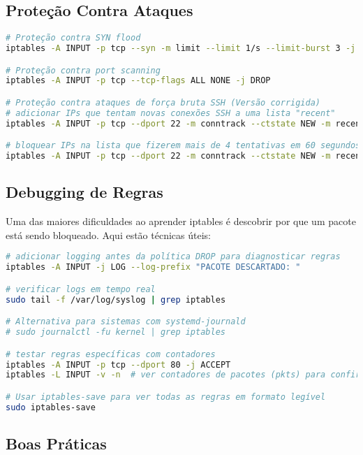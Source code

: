 ﻿\documentclass[12pt,fleqn]{article}
\begin{document}
\subsection{Proteção Contra Ataques}

\begin{lstlisting}[language=bash, caption=Proteções de segurança]
# Proteção contra SYN flood
iptables -A INPUT -p tcp --syn -m limit --limit 1/s --limit-burst 3 -j ACCEPT

# Proteção contra port scanning
iptables -A INPUT -p tcp --tcp-flags ALL NONE -j DROP

# Proteção contra ataques de força bruta SSH (Versão corrigida)
# adicionar IPs que tentam novas conexões SSH a uma lista "recent"
iptables -A INPUT -p tcp --dport 22 -m conntrack --ctstate NEW -m recent --set --name SSH --rsource

# bloquear IPs na lista que fizerem mais de 4 tentativas em 60 segundos
iptables -A INPUT -p tcp --dport 22 -m conntrack --ctstate NEW -m recent --update --seconds 60 --hitcount 4 --name SSH --rsource -j DROP
\end{lstlisting}

\subsection{Debugging de Regras}

Uma das maiores dificuldades ao aprender iptables é descobrir por que um pacote está sendo bloqueado. Aqui estão técnicas úteis:

\begin{lstlisting}[language=bash, caption=Técnicas de debugging]
# adicionar logging antes da política DROP para diagnosticar regras
iptables -A INPUT -j LOG --log-prefix "PACOTE DESCARTADO: "

# verificar logs em tempo real
sudo tail -f /var/log/syslog | grep iptables

# Alternativa para sistemas com systemd-journald
# sudo journalctl -fu kernel | grep iptables

# testar regras específicas com contadores
iptables -A INPUT -p tcp --dport 80 -j ACCEPT
iptables -L INPUT -v -n  # ver contadores de pacotes (pkts) para confirmar que a regra foi atingida

# Usar iptables-save para ver todas as regras em formato legível
sudo iptables-save
\end{lstlisting}

\subsection{Boas Práticas}
\end{document}
